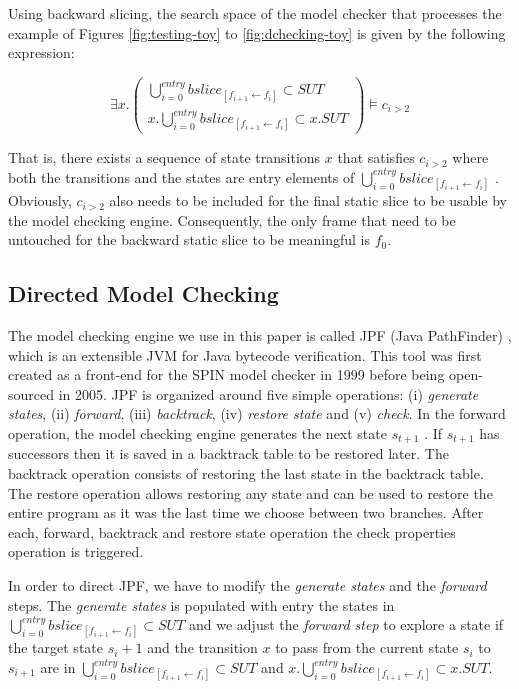 \documentclass[times]{smrauth}
\begin{document}
\vspace*{0.3cm}

Using backward slicing, the search space of the model checker
that processes the example of Figures \ref{fig:testing-toy} to \ref{fig:dchecking-toy} is given by the
following expression:

\begin{equation}
  \exists x.
  \begin{pmatrix}
    \bigcup_{i=0}^{entry} bslice_{[f_{i+1} \leftarrow f_i]}  \subset SUT \\
    x.\bigcup_{i=0}^{entry} bslice_{[f_{i+1} \leftarrow f_i]}  \subset x.SUT
  \end{pmatrix}
  \models c_{i>2}
\end{equation}

That is, there exists a sequence of state transitions $x$ that
satisfies $c_{i>2}$ where both the transitions and the states are
entry
elements of $\bigcup_{i=0}^{entry} bslice_{[f_{i+1} \leftarrow f_i]}$ . Obviously, $c_{i>2}$ also
needs to be included for the final static slice to be usable by
the model checking engine. Consequently, the only frame that
need to be untouched for the backward static slice to be
meaningful is $f_0$.

\subsection{Directed Model Checking}

The model checking engine we use in this paper is called JPF
(Java PathFinder) \cite{Visser2004}, which is an extensible JVM for Java
bytecode verification. This tool was first created as a front-end
for the SPIN model checker \cite{holzmann1997model} in 1999 before being open-
sourced in 2005. JPF is organized around five simple
operations: (i) {\it generate states}, (ii) {\it forward}, (iii) {\it backtrack},
(iv) {\it restore state} and (v) {\it check}. In the forward operation, the
model checking engine generates the next state $s_{t+1}$ . If
$s_{t+1}$ has successors then it is saved in a backtrack table to be
restored later. The backtrack operation consists of restoring
the last state in the backtrack table. The restore operation
allows restoring any state and can be used to restore the entire
program as it was the last time we choose between two
branches. After each, forward, backtrack and restore state
operation the check properties operation is triggered.

In order to direct JPF, we have to modify the {\it generate states}
and the {\it forward} steps. The {\it generate states} is populated with
entry
the states in $\bigcup_{i=0}^{entry} bslice_{[f_{i+1} \leftarrow f_i]}  \subset SUT$ and we adjust the
{\it forward step} to explore a state if the target state $s_i+1$ and the
transition $x$ to pass from the current state $s_i$ to $s_{i+1}$ are in
$\bigcup_{i=0}^{entry} bslice_{[f_{i+1} \leftarrow f_i]}  \subset SUT$ and $x.\bigcup_{i=0}^{entry} bslice_{[f_{i+1} \leftarrow f_i]}  \subset x.SUT$.
\end{document}
